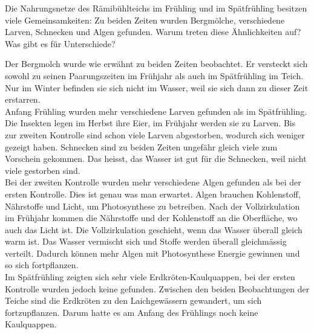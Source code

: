 \documentclass{article}
\begin{document}
        Die Nahrungsnetze des Rämibühlteichs im Frühling und im Spätfrühling besitzen viele Gemeinsamkeiten: Zu beiden Zeiten wurden Bergmölche, verschiedene Larven, Schnecken und Algen gefunden. Warum treten diese Ähnlichkeiten auf? Was gibt es für Unterschiede? \\
        \vspace{5mm}
        
        Der Bergmolch wurde wie erwähnt zu beiden Zeiten beobachtet. Er versteckt sich sowohl zu seinen Paarungszeiten im Frühjahr als auch im Spätfrühling im Teich. Nur im Winter befinden sie sich nicht im Wasser, weil sie sich dann zu dieser Zeit erstarren.\\
        \vspace{5mm}
        Anfang Frühling wurden mehr verschiedene Larven gefunden als im Spätfrühling. Die Insekten legen im Herbst ihre Eier, im Frühjahr werden sie zu Larven. Bis zur zweiten Kontrolle sind schon viele Larven abgestorben, wodurch sich weniger gezeigt haben.
        Schnecken sind zu beiden Zeiten ungefähr gleich viele zum Vorschein gekommen. Das heisst, das Wasser ist gut für die Schnecken, weil nicht viele gestorben sind. \\
        \vspace{5mm}
        Bei der zweiten Kontrolle wurden mehr verschiedene Algen gefunden als bei der ersten Kontrolle. Dies ist genau was man erwartet. Algen brauchen Kohlenstoff, Nährstoffe und Licht, um Photosynthese zu betreiben. Nach der Vollzirkulation im Frühjahr kommen die Nährstoffe und der Kohlenstoff an die Oberfläche, wo auch das Licht ist. Die Vollzirkulation geschieht, wenn das Wasser überall gleich warm ist. Das Wasser vermischt sich und Stoffe werden überall gleichmässig verteilt. Dadurch können mehr Algen mit Photosynthese Energie gewinnen und so sich fortpflanzen. \\
        \vspace{5mm}
        Im Spätfrühling zeigten sich sehr viele Erdkröten-Kaulquappen, bei der ersten Kontrolle wurden jedoch keine gefunden. Zwischen den beiden Beobachtungen der Teiche sind die Erdkröten zu den Laichgewässern gewandert, um sich fortzupflanzen. Darum hatte es am Anfang des Frühlings noch keine Kaulquappen. \\
        
        
    
\end{document}
